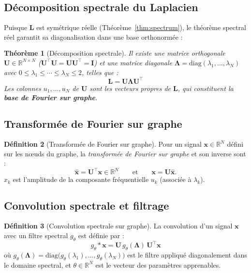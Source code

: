 \documentclass[12pt, a4paper]{article}
\newtheorem{theorem}{Théorème}[section]
\theoremstyle{definition}
\newtheorem{definition}[theorem]{Définition}
\newcommand{\R}{\mathbb{R}}
\newcommand{\mat}[1]{\mathbf{#1}}
\newcommand{\I}{\mat{I}}
\newcommand{\L}{\mat{L}}
\newcommand{\Lam}{\mat{\Lambda}}
\newcommand{\U}{\mat{U}}
\newcommand{\x}{\mathbf{x}}
\begin{document}
\subsection{Décomposition spectrale du Laplacien}

Puisque $\L$ est symétrique réelle (Théorème~\ref{thm:spectrum}),
le théorème spectral réel garantit sa diagonalisation dans une base orthonormée :

\begin{theorem}[Décomposition spectrale]
\label{thm:diag}
Il existe une matrice orthogonale $\U \in \R^{N \times N}$ ($\U^\top \U = \U \U^\top = \I$)
et une matrice diagonale $\Lam = \mathrm{diag}(\lambda_1, \ldots, \lambda_N)$
avec $0 \leq \lambda_1 \leq \cdots \leq \lambda_N \leq 2$, telles que :
\[
  \boxed{\L = \U \Lam \U^\top}
\]
Les colonnes $u_1, \ldots, u_N$ de $\U$ sont les \emph{vecteurs propres} de $\L$,
qui constituent la \textbf{base de Fourier sur graphe}.
\end{theorem}

\subsection{Transformée de Fourier sur graphe}

\begin{definition}[Transformée de Fourier sur graphe]
Pour un signal $\x \in \R^N$ défini sur les nœuds du graphe, la
\emph{transformée de Fourier sur graphe} et son inverse sont :
\[
  \hat{\x} = \U^\top \x \in \R^N
  \qquad \text{et} \qquad
  \x = \U \hat{\x}.
\]
$\hat{x}_k$ est l'amplitude de la composante fréquentielle $u_k$ (associée à $\lambda_k$).
\end{definition}

\subsection{Convolution spectrale et filtrage}

\begin{definition}[Convolution spectrale sur graphe]
\label{def:spectral_conv}
La convolution d'un signal $\x$ avec un filtre spectral $g_\theta$ est définie par :
\[
  \boxed{g_\theta * \x = \U\, g_\theta(\Lam)\, \U^\top \x}
\]
où $g_\theta(\Lam) = \mathrm{diag}\bigl(g_\theta(\lambda_1), \ldots, g_\theta(\lambda_N)\bigr)$
est le filtre appliqué diagonalement dans le domaine spectral,
et $\theta \in \R^N$ est le vecteur des paramètres apprenables.
\end{definition}
\end{document}

